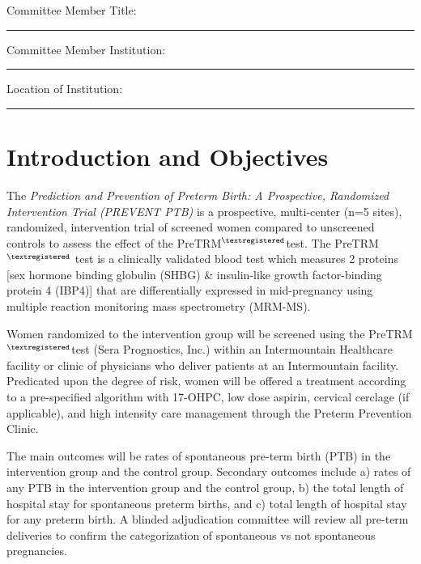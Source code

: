 \documentclass[12pt]{article}
\def\protname{Prediction and Prevention of Preterm Birth: A Prospective, Randomized Intervention Trial (PREVENT PTB)}%
\def\pretrm {PreTRM$^{\small{\textregistered}}$}
\begin{document}
\vspace{0.4cm}
\noindent Committee Member Title: 

\vspace{0.7cm}
\noindent\rule{16cm}{0.4pt}

\vspace{0.4cm}
\noindent Committee Member Institution: 

\vspace{0.7cm}
\noindent\rule{16cm}{0.4pt}

\vspace{0.4cm}
\noindent Location of Institution: 

\vspace{0.7cm}
\noindent\rule{16cm}{0.4pt}


\newpage

\tableofcontents

\newpage


\section{Introduction and Objectives}
The \textit{\protname} is a prospective, multi-center (n=5 sites), 
randomized, intervention trial of screened women compared to unscreened 
controls to assess the effect of the \pretrm \space test. The \pretrm \space 
test is a clinically validated blood test which measures 2 proteins [sex 
hormone binding globulin (SHBG) \& insulin-like growth factor-binding 
protein 4 (IBP4)] that are differentially expressed in mid-pregnancy using 
multiple reaction monitoring mass spectrometry (MRM-MS). 

Women randomized to the intervention group will be screened using the 
\pretrm \space test (Sera Prognostics, Inc.) within an Intermountain 
Healthcare facility or clinic of physicians who deliver patients at an 
Intermountain facility.  Predicated upon the degree of risk, women will be 
offered a treatment according to a pre-specified algorithm with 17-OHPC, low 
dose aspirin, cervical cerclage (if applicable), and high intensity care 
management through the Preterm Prevention Clinic.

The main outcomes will be rates of spontaneous pre-term birth (PTB) in the 
intervention group and the control group. Secondary outcomes include a) 
rates of any PTB in the intervention group and the control group, b) the 
total length of hospital stay for spontaneous preterm births, and c) total 
length of hospital stay for any preterm birth. A blinded adjudication 
committee will review all pre-term deliveries to confirm the categorization 
of spontaneous vs not spontaneous pregnancies. 
\end{document}
